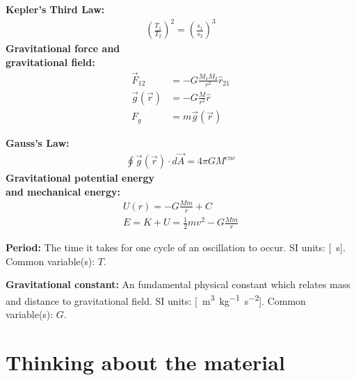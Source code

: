 \begin{importantEquations}
\medskip
\begin{multicols}{2}
\textbf{Kepler's Third Law:}
\begin{align*}
\left(\frac{T_1}{T_2}\right)^2=\left(\frac{s_1}{s_2}\right)^3
\end{align*}
\textbf{Gravitational force and\\ gravitational field:}
\begin{align*}
\vec F_{12}&=-G\frac{M_1M_2}{r^2}\hat r_{21}\\
\vec g(\vec r)&=-G\frac{M}{r^2}\hat r\\
F_g &= m \vec g(\vec r)
\end{align*}
\columnbreak

\textbf{Gauss's Law:}
\begin{align*}
\oint \vec g(\vec r) \cdot d\vec A = 4\pi G M^{enc}
\end{align*}
\textbf{Gravitational potential energy\\ and mechanical energy:}
\begin{align*}
U(r) = -G\frac{Mm}{r} + C\\
E = K + U = \frac{1}{2}mv^2 - G\frac{Mm}{r}
\end{align*}
\medskip
\end{multicols}
\end{importantEquations}

\begin{definitions}
	
	\textbf{Period:} The time it takes for one cycle of an oscillation to occur. SI units: [\SI{}{s}]. Common variable(s): $T$.
	\medskip
	
	\item \textbf{Gravitational constant:} An fundamental physical constant which relates mass and distance to gravitational field. SI units: [\SI{}{m^3kg^{-1}s^{-2}}]. Common variable(s): $G$.
	\medskip
	
\end{definitions}

\newpage
\section{Thinking about the material}

